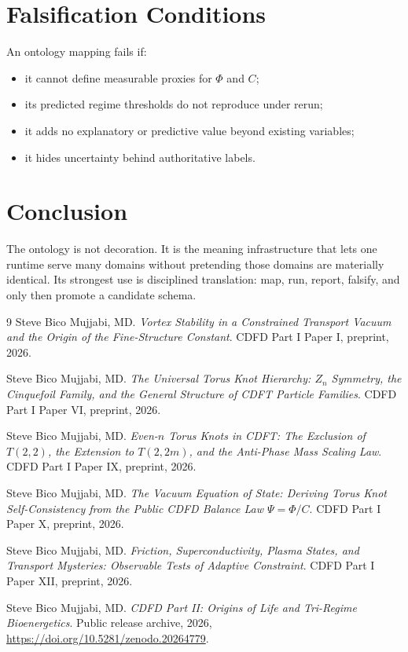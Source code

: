 \documentclass[12pt,a4paper]{article}
\begin{document}
\section{Falsification Conditions}
An ontology mapping fails if:
\begin{itemize}
    \item it cannot define measurable proxies for $\Phi$ and $C$;
    \item its predicted regime thresholds do not reproduce under rerun;
    \item it adds no explanatory or predictive value beyond existing variables;
    \item it hides uncertainty behind authoritative labels.
\end{itemize}

\section{Conclusion}
The ontology is not decoration. It is the meaning infrastructure that lets one
runtime serve many domains without pretending those domains are materially
identical. Its strongest use is disciplined translation: map, run, report,
falsify, and only then promote a candidate schema.
\begin{thebibliography}{9}
Steve Bico Mujjabi, MD. \emph{Vortex Stability in a Constrained Transport Vacuum and the Origin of the Fine-Structure Constant}. CDFD Part I Paper I, preprint, 2026.

Steve Bico Mujjabi, MD. \emph{The Universal Torus Knot Hierarchy: $Z_n$ Symmetry, the Cinquefoil Family, and the General Structure of CDFT Particle Families}. CDFD Part I Paper VI, preprint, 2026.

Steve Bico Mujjabi, MD. \emph{Even-$n$ Torus Knots in CDFT: The Exclusion of $T(2,2)$, the Extension to $T(2,2m)$, and the Anti-Phase Mass Scaling Law}. CDFD Part I Paper IX, preprint, 2026.

Steve Bico Mujjabi, MD. \emph{The Vacuum Equation of State: Deriving Torus Knot Self-Consistency from the Public CDFD Balance Law $\Psi = \Phi/C$}. CDFD Part I Paper X, preprint, 2026.

Steve Bico Mujjabi, MD. \emph{Friction, Superconductivity, Plasma States, and Transport Mysteries: Observable Tests of Adaptive Constraint}. CDFD Part I Paper XII, preprint, 2026.

Steve Bico Mujjabi, MD. \emph{CDFD Part II: Origins of Life and Tri-Regime Bioenergetics}. Public release archive, 2026, \url{https://doi.org/10.5281/zenodo.20264779}.
\end{thebibliography}
\end{document}
